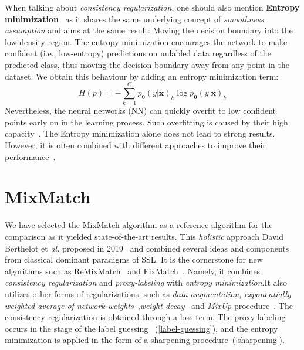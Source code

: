 When talking about \textit{consistency regularization}, one should also mention \textbf{Entropy minimization}~\cite{entropy-min-2004} as it shares the same underlying concept
of \textit{smoothness assumption} and aims at the same result: Moving the decision boundary into the low-density region. The entropy minimization encourages the 
network to make confident (i.e., low-entropy) predictions on unlabled data regardless of the predicted class, thus moving the decision boundary away from any point in the dataset.
We obtain this behaviour by adding an entropy minimization term:
\begin{equation*}
    H(p) = -\sum_{k=1}^{C} p_\mathbf{\theta}(y|\mathbf{x})_k \log p_\mathbf{\theta}(y|\mathbf{x})_k
\end{equation*}
Nevertheless, the neural networks (NN) can quickly overfit to low confident points early on in the learning process. 
Such overfitting is caused by their high capacity~\cite{how-to-evalute-ssl-2018}. The Entropy minimization alone
does not lead to strong results. However, it is often combined with different approaches to improve their performance~\cite{ssl-overview-2020}.

\section{MixMatch}
\label{sec:mix-match}
We have selected the MixMatch algorithm as a reference algorithm for the comparison as it yielded state-of-the-art results. This \textit{holistic} approach
David Berthelot et \textit{al.} proposed in 2019~\cite{mixmatch-2019} and combined several ideas and components from classical dominant paradigms of SSL.
It is the cornerstone for new algorithms such as ReMixMatch~\cite{remixmatch-2020} and FixMatch~\cite{fixmatch-2020}. Namely, it combines 
\textit{consistency regularization} and \textit{proxy-labeling} with \textit{entropy minimization}.It also utilizes other forms of regularizations, such as
\textit{data augmentation}, \textit{exponentially weighted average of network weights}~\cite{mean-teacher-2018},\textit{weight decay}~\cite{weight-decay-2019} and 
\textit{MixUp} procedure~\cite{mixup-2018}. The consistency regularization is obtained through a loss term. The proxy-labeling occurs in the stage of the label 
guessing ~(\ref{label-guessing}), and the entropy minimization is applied in the form of a sharpening procedure~(\ref{sharpening}).

